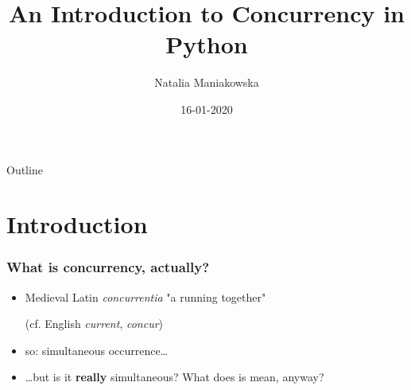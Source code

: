\documentclass{beamer}
\title{An Introduction to Concurrency in Python}
\author{Natalia Maniakowska}
\institute{skygate}
\date{16-01-2020}
\begin{document}
    \frame{\titlepage}

    \begin{frame}{Outline}
        \tableofcontents
    \end{frame}


    \section{Introduction}


    \begin{frame}
        \frametitle{What is concurrency, actually?}

        \begin{itemize}
            \item Medieval Latin \emph{concurrentia} "a running together"

            (cf. English \emph{current}, \emph{concur})
            \item so: simultaneous occurrence\dots
            \item \dots but is it \textbf{really} simultaneous? What does is mean, anyway?

        \end{itemize}

    \end{frame}
\end{document}

